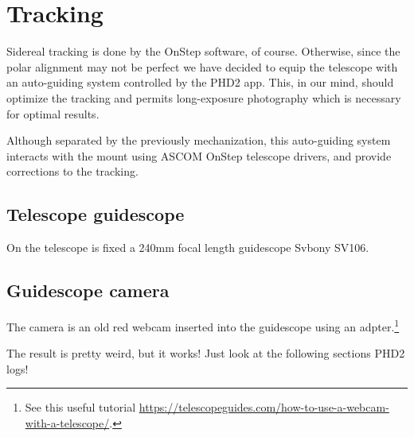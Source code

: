 \section{Tracking}
Sidereal tracking is done by the OnStep software, of course.
Otherwise, since the polar alignment may not be perfect we have decided to equip the telescope with an auto-guiding system controlled by the PHD2 app.
This, in our mind, should optimize the tracking and permits long-exposure photography which is necessary for optimal results.

Although separated by the previously mechanization, this auto-guiding system interacts with the mount using ASCOM OnStep telescope drivers, and provide corrections to the tracking.

\subsection{Telescope guidescope}
On the telescope is fixed a 240mm focal length guidescope Svbony SV106.

\subsection{Guidescope camera}
The camera is an old red webcam inserted into the guidescope using an adpter.\footnote{See this useful tutorial \url{https://telescopeguides.com/how-to-use-a-webcam-with-a-telescope/}.}

The result is pretty weird, but it works!
Just look at the following sections PHD2 logs!